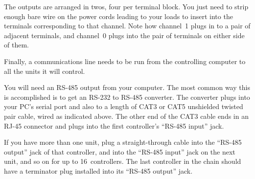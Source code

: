 \documentclass[12pt]{article}
\begin{document}
\begin{center}
\end{center}

The outputs are arranged in twos, four per terminal block.  You just need to
strip enough bare wire on the power cords leading to your loads to insert
into the terminals corresponding to that channel.  Note how channel~1 plugs
in to a pair of adjacent terminals, and channel~0 plugs into the pair of 
terminals on either side of them.  


Finally, a communications line needs to be run from the controlling computer
to all the units it will control.

You will need an RS-485 output from your computer.  The most common way this
is accomplished is to get an RS-232 to RS-485 converter.  The converter plugs
into your PC's serial port and also to a length of CAT3 or CAT5 unshielded
twisted pair cable, wired as indicated above.  The other end of the CAT3
cable ends in an RJ-45 connector and plugs into the first controller's
``RS-485 input'' jack.  

If you have more than one unit, plug a straight-through cable into the
``RS-485 output'' jack of that controller, and into the ``RS-485 input'' jack
on the next unit, and so on for up to 16~controllers.  The last controller in
the chain should have a terminator plug installed into its ``RS-485 output''
jack.
\end{document}
